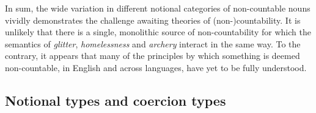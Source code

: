 \documentclass[output=paper]{langscibook}
\begin{document}


In sum, the wide variation in different notional categories of non-countable nouns vividly demonstrates the challenge awaiting theories of (non-)countability.  It is unlikely that there is a single, monolithic source of non-countability for which the semantics of \textit{glitter}, \textit{homelessness} and \textit{archery} interact in the same way. To the contrary, it appears that many of the principles by which something is deemed non-countable, in English and across languages, have yet to be fully understood.     %















\subsection{Notional types and coercion types}
\end{document}
